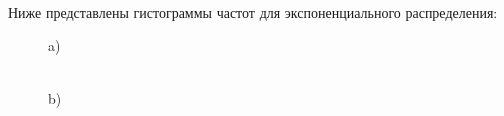 \documentclass[a4paper,12pt, oneside]{book}
\begin{document}
\begin{figure}[h!]
\begin{center}
\begin{minipage}[h]{0.47\linewidth}
		\end{minipage}
	\end{center}
\end{figure}

\newpage
$$
$$

\newpage
$$
$$

\newpage
$$
$$

\\

Ниже представлены гистограммы частот для экспоненциального  распределения:\\

\begin{figure}[h!]
	\begin{center}
		\begin{minipage}[h]{0.47\linewidth}
			 a) \\
		\end{minipage}
		\hfill
		\begin{minipage}[h]{0.47\linewidth}
			 \\b)

\end{minipage}
\end{center}
\end{figure}
\end{document}
